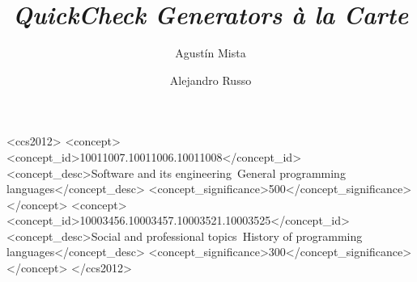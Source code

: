 \documentclass[sigplan,review,anonymous]{acmart}
\begin{document}
\title{\textit{QuickCheck Generators \`a la Carte}}



\author{Agust\'in Mista}

\author{Alejandro Russo}



\begin{abstract}
\end{abstract}


\begin{CCSXML}
<ccs2012>
<concept>
<concept_id>10011007.10011006.10011008</concept_id>
<concept_desc>Software and its engineering~General programming languages</concept_desc>
<concept_significance>500</concept_significance>
</concept>
<concept>
<concept_id>10003456.10003457.10003521.10003525</concept_id>
<concept_desc>Social and professional topics~History of programming languages</concept_desc>
<concept_significance>300</concept_significance>
</concept>
</ccs2012>
\end{CCSXML}


\end{document}
